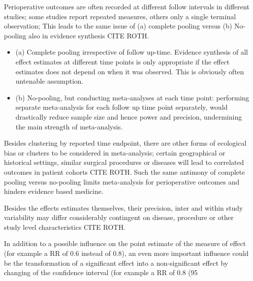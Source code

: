 \documentclass[11pt,notitlepage]{article}
\begin{document}
Perioperative outcomes are often recorded at different follow intervals in different studies; some studies report repeated measures, others only a single terminal observation; This leads to the same issue of (a) complete pooling versus (b) No-pooling also in evidence synthesis CITE ROTH.

\begin{itemize}

\item (a) Complete pooling irrespective of follow up-time.
Evidence synthesis of all effect estimates at different time points is only appropriate if the effect estimates does not depend on when it was observed. This is obviously often untenable assumption.

\item (b) No-pooling, but conducting meta-analyses at each time point: performing separate meta-analysis for each follow up time point separately, would drastically reduce sample size and hence power and precision, undermining the main strength of meta-analysis.

\end{itemize}

Besides clustering by reported time endpoint, there are other forms of ecological bias or clusters to be considered in meta-analysis; certain geographical or historical settings, similar surgical procedures or diseases will lead to correlated outcomes in patient cohorts \cite{Abroug2011,Andreae2013,Andreae2015} CITE ROTH. Such the same antimony of complete pooling versus no-pooling limits meta-analysis for perioperative outcomes and hinders evidence based medicine.

Besides the effects estimates themselves, their precision, inter and within study variability may differ considerably contingent on disease, procedure or other study level characteristics \cite{Andreae2013,Andreae2015}CITE ROTH.

In addition to a possible influence on the point estimate of the measure of effect (for example a RR of 0.6 instead of 0.8), an even more important influence could be the transformation of a significant effect into a non-significant effect by changing of the confidence interval (for example a RR of 0.8 (95%
\end{document}
